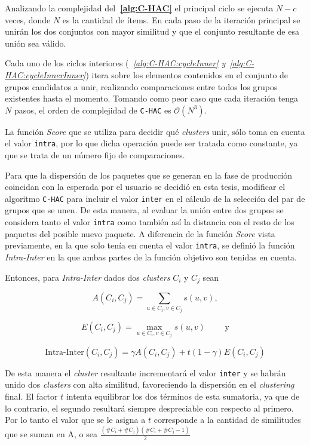 Analizando la complejidad del\textbf{~\autoref{alg:C-HAC}} el principal ciclo se ejecuta $N - c$ veces, donde $N$ es la cantidad de ítems. En cada paso de la iteración principal se unirán los dos conjuntos con mayor similitud y que el conjunto resultante de esa unión sea válido. 

Cada uno de los ciclos interiores (\textit{~\autoref{alg:C-HAC:cycleInner} y~\autoref{alg:C-HAC:cycleInnerInner}}) itera sobre los elementos contenidos en el conjunto de grupos candidatos a unir, realizando comparaciones entre todos los grupos existentes hasta el momento. Tomando como peor caso que cada iteración tenga $N$ pasos, el orden de complejidad de \texttt{C-HAC} es $\mathcal{O}(N^{3})$. 

La función \textit{Score} que se utiliza para decidir qué {\em clusters} unir, sólo toma en cuenta el valor \texttt{intra}, por lo que dicha operación puede ser tratada como constante, ya que se trata de un número fijo de comparaciones.

Para que la dispersión de los paquetes que se generan en la fase de producción coincidan con la esperada por el usuario se decidió en esta tesis, modificar el algoritmo \texttt{C-HAC} para incluir el valor \texttt{inter} en el cálculo de la selección del par de grupos que se unen. De esta manera, al evaluar la unión entre dos grupos se considera tanto el valor \texttt{intra} como también así la distancia con el resto de los paquetes del posible nuevo paquete. A diferencia de la función \textit{Score} vista previamente, en la que solo tenía en cuenta el valor \texttt{intra}, se definió la función \textit{Intra-Inter} en la que ambas partes de la función objetivo son tenidas en cuenta. 

Entonces, para \textit{Intra-Inter} dados dos {\em clusters} $C_i$ y $C_j$ sean

$$A(C_i,C_j) = \sum_{u \in C_i, v \in C_j}{s(u,v)},$$

$$E(C_i,C_j)=\max_{u \in C_i, v \in C_j}{s(u,v)} \qquad \mbox{ y}$$

$$\mbox{Intra-Inter}(C_i,C_j) = \gamma A(C_i,C_j) + t (1-\gamma) E(C_i,C_j)$$

De esta manera el {\em cluster} resultante incrementará el valor \texttt{inter} y se habrán unido dos {\em clusters} con alta similitud, favoreciendo la dispersión en el {\em clustering} final. El factor $t$ intenta equilibrar los dos términos de esta sumatoria, ya que de lo contrario, el segundo resultará siempre despreciable con respecto al primero. Por lo tanto el valor que se le asigna a $t$ corresponde a la cantidad de similitudes que se suman en A, o sea $\frac{(\#C_i + \#C_j) (\#C_i + \#C_j - 1)}{2}$  

